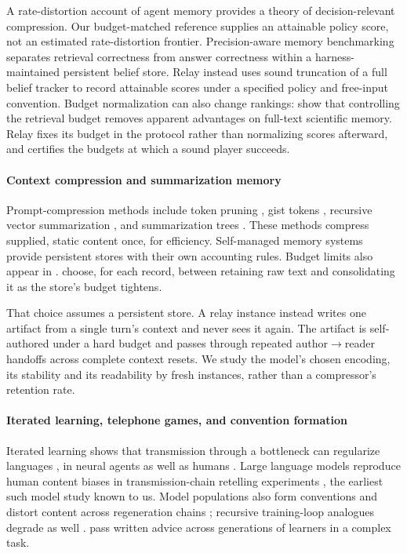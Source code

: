 A rate-distortion account of agent memory \citep{ratedistortion2026} provides a theory of decision-relevant compression. Our budget-matched reference supplies an attainable policy score, not an estimated rate-distortion frontier. Precision-aware memory benchmarking \citep{precisionmembench2026} separates retrieval correctness from answer correctness within a harness-maintained persistent belief store. Relay instead uses sound truncation of a full belief tracker to record attainable scores under a specified policy and free-input convention. Budget normalization can also change rankings: \citet{budgetrestoration2026} show that controlling the retrieval budget removes apparent advantages on full-text scientific memory. Relay fixes its budget in the protocol rather than normalizing scores afterward, and certifies the budgets at which a sound player succeeds.

\paragraph{Context compression and summarization memory}
Prompt-compression methods include token pruning \citep{llmlingua2023}, gist tokens \citep{gist2023}, recursive vector summarization \citep{autocompressors2023,icae2023}, and summarization trees \citep{raptor2024,wu2021books}. These methods compress supplied, static content once, for efficiency. Self-managed memory systems \citep{memgpt2023,generativeagents2023,latentctx2026} provide persistent stores with their own accounting rules. Budget limits also appear in \citet{retainconsolidate2026,memaudit2026,budgetbench2026}. \citet{retainconsolidate2026} choose, for each record, between retaining raw text and consolidating it as the store's budget tightens.

That choice assumes a persistent store. A relay instance instead writes one artifact from a single turn's context and never sees it again. The artifact is self-authored under a hard budget and passes through repeated author$\to$reader handoffs across complete context resets. We study the model's chosen encoding, its stability and its readability by fresh instances, rather than a compressor's retention rate.

\paragraph{Iterated learning, telephone games, and convention formation}
Iterated learning shows that transmission through a bottleneck can regularize languages \citep{kirby2001,kirby2008}, in neural agents as well as humans \citep{ren2020,chaabouni2020,lu2020seeded}. Large language models reproduce human content biases in transmission-chain retelling experiments \citep{acerbi2023}, the earliest such model study known to us. Model populations also form conventions \citep{conventions2024} and distort content across regeneration chains \citep{telephone2024,brokentelephone2025}; recursive training-loop analogues degrade as well \citep{shumailov2024}. \citet{colas2025} pass written advice across generations of learners in a complex task.

